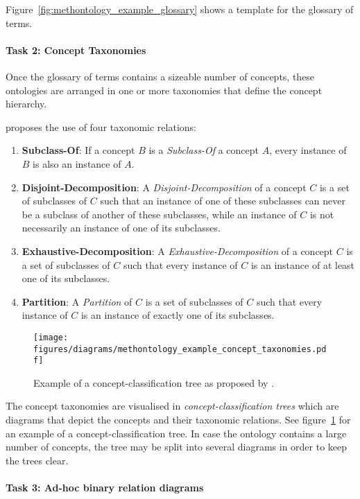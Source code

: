 Figure~\ref{fig:methontology_example_glossary} shows a template for the glossary of terms.

\paragraph{Task 2: Concept Taxonomies}

Once the glossary of terms contains a sizeable number of concepts, these ontologies are arranged in one or more taxonomies that define the concept hierarchy.

\methontology proposes the use of four taxonomic relations:
\begin{enumerate}
  \item \textbf{Subclass-Of}: If a concept $B$ is a \emph{Subclass-Of} a concept $A$, every instance of $B$ is also an instance of $A$.
  \item \textbf{Disjoint-Decomposition}: A \emph{Disjoint-Decomposition} of a concept $C$ is a set of subclasses of $C$ such that an instance of one of these subclasses can never be a subclass of another of these subclasses, while an instance of $C$ is not necessarily an instance of one of its subclasses.
  \item \textbf{Exhaustive-Decomposition}: A \emph{Exhaustive-Decomposition} of a concept $C$ is a set of subclasses of $C$ such that every instance of $C$ is an instance of at least one of its subclasses.
  \item \textbf{Partition}: A \emph{Partition} of $C$ is a set of subclasses of $C$ such that every instance of $C$ is an instance of exactly one of its subclasses.
\end{enumerate}

\begin{figure}
\centering
\texttt{[image: figures/diagrams/methontology\_example\_concept\_taxonomies.pdf]}
\caption{Example of a concept-classification tree as proposed by \methontology.}
\label{fig:methontology_example_concept_taxonomies}
\end{figure}

The concept taxonomies are visualised in \emph{concept-classification trees} which are diagrams that depict the concepts and their taxonomic relations. See figure~\ref{fig:methontology_example_concept_taxonomies} for an example of a concept-classification tree. In case the ontology contains a large number of concepts, the tree may be split into several diagrams in order to keep the trees clear.

\paragraph{Task 3: Ad-hoc binary relation diagrams}

